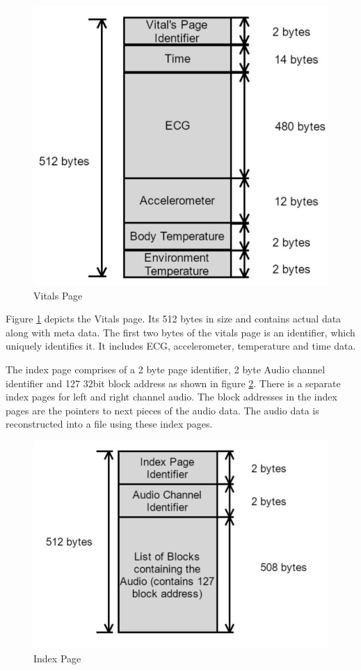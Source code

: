 \begin{figure}[h]
	\centering
	\includegraphics[scale = 0.5 ]{vital_page.JPG}
	\caption{Vitals Page\label{vital_page}}
\end{figure}


Figure \ref{vital_page} depicts the Vitals page. Its 512 bytes in size and contains actual data along with meta data. The first two bytes of the vitals page is an identifier, which uniquely identifies it. It includes ECG, accelerometer, temperature and time data. 


 The index page comprises of a 2 byte page identifier, 2 byte Audio channel identifier and 127 32bit block address as shown in figure \ref{index_page}. There is a separate index pages for left and right channel audio. The block addresses in the index pages are the pointers to next pieces of the audio data. The audio data is reconstructed into a file using these index pages.
 
\begin{figure}[h]
	\centering
	\includegraphics[scale = 0.5 ]{index_page.JPG}
	\caption{Index Page\label{index_page}}
\end{figure}

